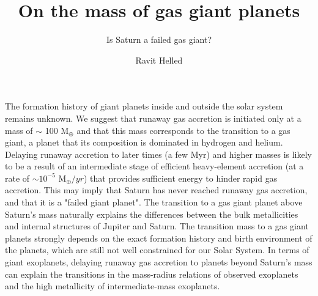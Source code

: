 \documentclass{aa}
\begin{document}
\title{On the mass of gas giant planets}

\subtitle{Is Saturn a failed gas giant?}

\author{Ravit Helled}



\abstract
{The formation history of giant planets inside and outside the solar system remains unknown. We suggest that runaway gas accretion is initiated only at a mass of $\sim$ 100 M$_{\oplus}$ and that this  mass corresponds to the transition to a gas giant, a planet that its composition is dominated in hydrogen and helium. Delaying runaway accretion to later times (a few Myr) and higher masses is likely to be a result of an intermediate stage of efficient heavy-element accretion (at a rate of $\sim10^{-5}$ M$_\oplus/yr$) that provides sufficient energy to hinder rapid gas accretion. 
This may imply that Saturn has never reached runaway gas accretion, and that it is a "failed giant planet". The transition to a gas giant planet above Saturn's mass naturally explains the differences between the bulk metallicities and internal structures of Jupiter and Saturn.  
The transition mass to a gas giant planets strongly depends on the exact formation history and birth environment of the planets, which are still not well constrained for our Solar System. In terms of giant exoplanets, delaying runaway gas accretion to planets beyond Saturn's mass can explain the transitions in the mass-radius relations of observed exoplanets and the high metallicity of intermediate-mass  exoplanets. }



\maketitle

\nolinenumbers
\end{document}
